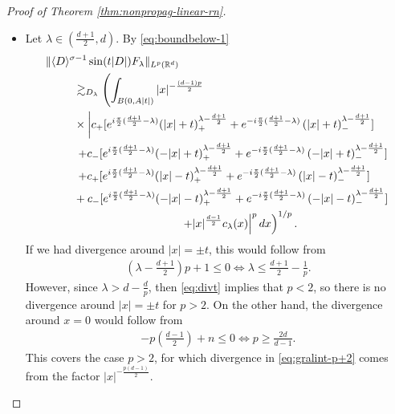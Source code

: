 \documentclass[a4paper, reqno, 11pt]{amsart}
\theoremstyle{definition}
\begin{document}
\begin{proof}[Proof of Theorem \ref{thm:nonpropag-linear-rn}]
\begin{itemize}
\item Let $\lambda \in (\frac{d+1}{2},d)$. By \eqref{eq:boundbelow-1}
\begin{align}\label{eq:gralint-p+2}
\| &\langle D \rangle^{\sigma-1} \sin(t|D|) F_{\lambda} \|_{L^p(\mathbb{R}^d)} \nonumber \\
&\qquad \gtrsim_{D_{\lambda}} \left(\int_{B(0,A|t|)} |x|^{-\frac{(d-1)p}{2}} \right. \nonumber \\
&\qquad \times\left| c_+ [ e^{i\frac{\pi}{2}(\frac{d+1}{2} - \lambda)} (|x| + t)_+^{\lambda-\frac{d+1}{2}} + e^{-i\frac{\pi}{2}(\frac{d+1}{2} - \lambda)} \left( |x| + t \right)_-^{\lambda-\frac{d+1}{2}}] \right. \nonumber \\
&\qquad \left. \left. + c_-  [ e^{i\frac{\pi}{2}(\frac{d+1}{2} - \lambda)}(-|x| + t)_+^{\lambda-\frac{d+1}{2}} + e^{-i\frac{\pi}{2}(\frac{d+1}{2} - \lambda)} \left( -|x| + t \right)_-^{\lambda-\frac{d+1}{2}} ]\right. \right. \nonumber \\
&\qquad \left. \left. + c_+ [ e^{i\frac{\pi}{2}(\frac{d+1}{2} - \lambda)} (|x| - t)_+^{\lambda-\frac{d+1}{2}} + e^{-i\frac{\pi}{2}(\frac{d+1}{2} - \lambda)} \left( |x| - t \right)_-^{\lambda-\frac{d+1}{2}}] \nonumber \right. \right. \\
&\qquad + c_-  [ e^{i\frac{\pi}{2}(\frac{d+1}{2} - \lambda)}(-|x| - t)_+^{\lambda-\frac{d+1}{2}} + e^{-i\frac{\pi}{2}(\frac{d+1}{2} - \lambda)} \left( -|x| - t \right)_-^{\lambda-\frac{d+1}{2}} ] \nonumber \\
&\hspace{40mm} \left. \left. + |x|^{\frac{d-1}{2}}c_{\lambda}(x) \right|^p  dx\right)^{1/p}.
\end{align}
If we had divergence around $|x| = \pm t$, this would follow from
\begin{align}\label{eq:divt}
\left( \lambda - \frac{d+1}{2} \right)p + 1 \leq 0 \Longleftrightarrow \lambda \leq \frac{d+1}{2} - \frac{1}{p}.
\end{align}
However, since $\lambda > d - \frac{d}{p}$, then \eqref{eq:divt} implies that $p<2$, so there is no divergence around $|x| = \pm t$ for $p>2$. On the other hand, the divergence around $x = 0$ would follow from
\begin{align*}
-p\left( \frac{d-1}{2} \right) + n \leq 0 \Longleftrightarrow p \geq \frac{2d}{d-1}.
\end{align*}
This covers the case $p>2$, for which divergence in \eqref{eq:gralint-p+2} comes from the factor $|x|^{-\frac{p(d-1)}{2}}$.\\


\end{itemize}
\end{proof}
\end{document}
